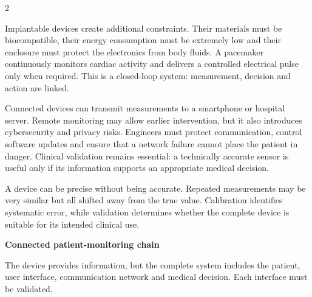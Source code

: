 \begin{multicols}{2}
\begin{ecarticle}
Implantable devices create additional constraints. Their materials must be biocompatible, their energy consumption must be extremely low and their enclosure must protect the electronics from body fluids. A pacemaker continuously monitors cardiac activity and delivers a controlled electrical pulse only when required. This is a closed-loop system: measurement, decision and action are linked.

Connected devices can transmit measurements to a smartphone or hospital server. Remote monitoring may allow earlier intervention, but it also introduces cybersecurity and privacy risks. Engineers must protect communication, control software updates and ensure that a network failure cannot place the patient in danger. Clinical validation remains essential: a technically accurate sensor is useful only if its information supports an appropriate medical decision.
\end{ecarticle}

\begin{tcolorbox}[title=\sffamily\bfseries Engineering Insight,colback=yellow!10,colframe=ECOrange]
A device can be precise without being accurate. Repeated measurements may be very similar but all shifted away from the true value. Calibration identifies systematic error, while validation determines whether the complete device is suitable for its intended clinical use.
\end{tcolorbox}

\begin{engineeringfocus}
\textbf{Connected patient-monitoring chain}
\begin{center}
\end{center}
The device provides information, but the complete system includes the patient, user interface, communication network and medical decision. Each interface must be validated.
\end{engineeringfocus}


\end{multicols}
